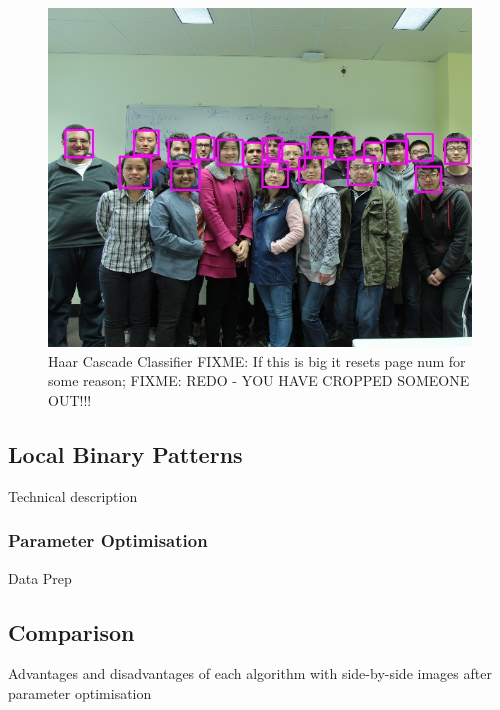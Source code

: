 \documentclass{article}
\begin{document}
\begin{figure}
\centering
\includegraphics[scale=1]{waiting_room_detected.jpg} %
\caption{Haar Cascade Classifier FIXME: If this is big it resets page num for some reason; FIXME: REDO - YOU HAVE CROPPED SOMEONE OUT!!!}
\label{fig:haar_cascade}
\end{figure}



\subsection{Local Binary Patterns}
Technical description
\subsubsection{Parameter Optimisation}
Data Prep

\subsection{Comparison}
Advantages and disadvantages of each algorithm with side-by-side images after parameter optimisation
\end{document}
